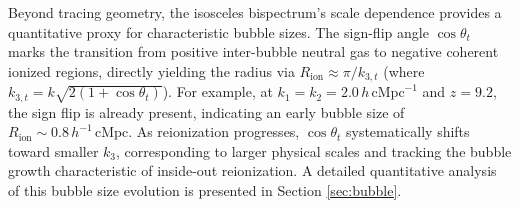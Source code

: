 \documentclass[apj,twocolumn, appendixfloats, twocolappendix, numberedappendix, tighten]{openjournal}
\begin{document}



Beyond tracing geometry, the isosceles bispectrum's scale dependence provides a quantitative proxy for characteristic bubble sizes. The sign-flip angle $\cos\theta_t$ marks the transition from positive inter-bubble neutral gas to negative coherent ionized regions, directly yielding the  radius via $R_\mathrm{ion} \approx \pi/k_{3,t}$ (where $k_{3,t} = k\sqrt{2(1 + \cos\theta_t)}$). For example, at $k_1 = k_2 = 2.0\,h\,\mathrm{cMpc}^{-1}$ and $z = 9.2$, the sign flip is already present, indicating an early bubble size of $R_\mathrm{ion} \sim 0.8\,h^{-1}\,\mathrm{cMpc}$. As reionization progresses, $\cos\theta_t$ systematically shifts toward smaller $k_3$, corresponding to larger physical scales and tracking the bubble growth characteristic of inside-out reionization. A detailed quantitative analysis of this bubble size evolution is presented in Section \ref{sec:bubble}.
\end{document}
